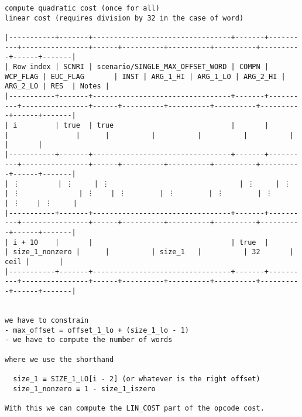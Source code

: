 \documentclass[varwidth=\maxdimen,margin=0.5cm,multi={verbatim}]{standalone}
\begin{document}
\begin{verbatim}
compute quadratic cost (once for all)
linear cost (requires division by 32 in the case of word)

|-----------+-------+---------------------------------+-------+----------+----------------+------+----------+----------+----------+----------+------+-------|
| Row index | SCNRI | scenario/SINGLE_MAX_OFFSET_WORD | COMPN | WCP_FLAG | EUC_FLAG       | INST | ARG_1_HI | ARG_1_LO | ARG_2_HI | ARG_2_LO | RES  | Notes |
|-----------+-------+---------------------------------+-------+----------+----------------+------+----------+----------+----------+----------+------+-------|
| i         | true  | true                            |       |          |                |      |          |          |          |          |      |       |
|-----------+-------+---------------------------------+-------+----------+----------------+------+----------+----------+----------+----------+------+-------|
| ⋮         | ⋮     | ⋮                               | ⋮     | ⋮        | ⋮              | ⋮    | ⋮        | ⋮        | ⋮        | ⋮        | ⋮    | ⋮     |
|-----------+-------+---------------------------------+-------+----------+----------------+------+----------+----------+----------+----------+------+-------|
| i + 10    |       |                                 | true  |          | size_1_nonzero |      |          | size_1   |          | 32       | ceil |       |
|-----------+-------+---------------------------------+-------+----------+----------------+------+----------+----------+----------+----------+------+-------|


we have to constrain
- max_offset = offset_1_lo + (size_1_lo - 1)
- we have to compute the number of words

where we use the shorthand

  size_1 ≡ SIZE_1_LO[i - 2] (or whatever is the right offset)
  size_1_nonzero ≡ 1 - size_1_iszero

With this we can compute the LIN_COST part of the opcode cost.



\end{verbatim}
\end{document}
